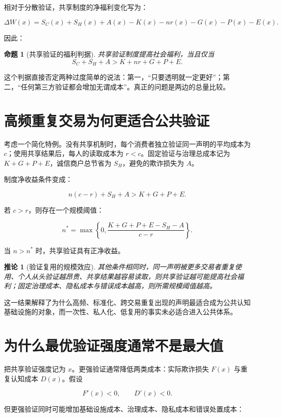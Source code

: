 \documentclass[UTF8,12pt]{ctexart}
\newtheorem{proposition}{命题}
\newtheorem{corollary}{推论}
\begin{document}
相对于分散验证，共享制度的净福利变化写为：

\[
\Delta W(x)
=S_C(x)+S_H(x)+A(x)
-K(x)-nr(x)-G(x)-P(x)-E(x).
\]

因此：

\begin{proposition}[共享验证的福利判据]
共享验证制度提高社会福利，当且仅当
\[
S_C+S_H+A
>K+nr+G+P+E.
\]
\end{proposition}

这个判据直接否定两种过度简单的说法：第一，“只要透明就一定更好”；第二，“任何第三方验证都会增加无谓成本”。真正的问题是两边的总量比较。

\section{高频重复交易为何更适合公共验证}

考虑一个简化特例。没有共享机制时，每个消费者独立验证同一声明的平均成本为 $c$；使用共享结果后，每人的读取成本为 $r<c$。固定验证与治理总成本记为 $K+G+P+E$，诚信商户总节省为 $S_H$，避免的欺诈损失为 $A$。

制度净收益条件变成：

\[
n(c-r)+S_H+A>K+G+P+E.
\]

若 $c>r$，则存在一个规模阈值：

\[
n^*
=\max\left\{0,
\frac{K+G+P+E-S_H-A}{c-r}
\right\}.
\]

当 $n>n^*$ 时，共享验证具有正净收益。

\begin{corollary}[验证复用的规模效应]
其他条件相同时，同一声明被更多交易者重复使用、个人从头验证越昂贵、共享结果越容易读取，则共享验证越可能提高社会福利；固定治理成本、隐私成本与错误成本越高，则所需规模阈值越高。
\end{corollary}

这一结果解释了为什么高频、标准化、跨交易重复出现的声明最适合成为公共认知基础设施的对象，而一次性、私人化、低复用的事实未必适合进入公共体系。

\section{为什么最优验证强度通常不是最大值}

把共享验证强度记为 $x$。更强验证通常降低两类成本：实际欺诈损失 $F(x)$ 与重复认知成本 $D(x)$。假设

\[
F'(x)<0,\qquad D'(x)<0.
\]

但更强验证同时可能增加基础设施成本、治理成本、隐私成本和错误处置成本：
\end{document}
